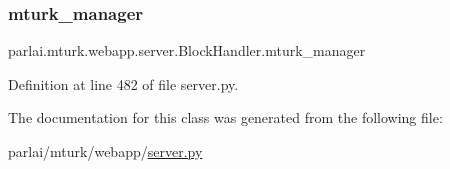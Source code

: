 \subsubsection{\texorpdfstring{mturk\+\_\+manager}{mturk\_manager}}
{\footnotesize\ttfamily parlai.\+mturk.\+webapp.\+server.\+Block\+Handler.\+mturk\+\_\+manager}



Definition at line 482 of file server.\+py.



The documentation for this class was generated from the following file\+:\begin{DoxyCompactItemize}
\item 
parlai/mturk/webapp/\hyperlink{server_8py}{server.\+py}\end{DoxyCompactItemize}
